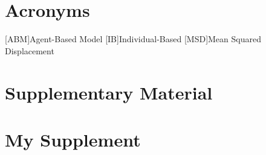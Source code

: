 \documentclass[a4paper]{article}
\begin{document}
\newpage
\printbibliography

\pagebreak
\section*{Acronyms}
\begin{acronym}
    [ABM]{Agent-Based Model}
    [IB]{Individual-Based}
    [MSD]{Mean Squared Displacement}
\end{acronym}

\listoffigures
\listoftables
\lstlistoflistings

\newpage
\section*{Supplementary Material}

\renewcommand{\thesection}{S\arabic{section}}
\setcounter{section}{0}

\section{My Supplement}
\end{document}

